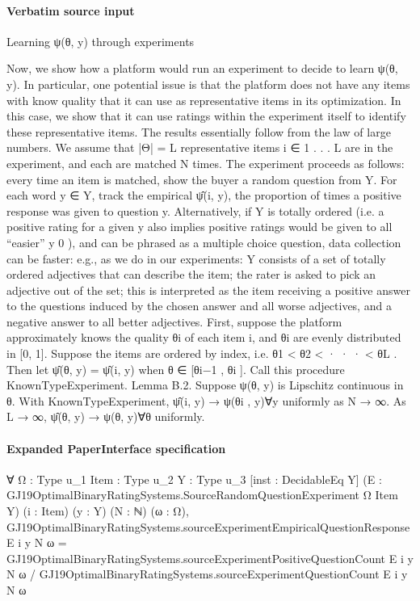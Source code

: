 \documentclass[10pt]{article}
\begin{document}
\paragraph{Verbatim source input}
\begin{ReviewVerbatim}
Learning ψ(θ, y) through experiments

Now, we show how a platform would run an experiment to decide to learn ψ(θ, y). In particular,
one potential issue is that the platform does not have any items with know quality that it can use
as representative items in its optimization. In this case, we show that it can use ratings within the
experiment itself to identify these representative items. The results essentially follow from the law
of large numbers.
We assume that |Θ| = L representative items i ∈ {1 . . . L} are in the experiment, and each are
matched N times. The experiment proceeds as follows: every time an item is matched, show the
buyer a random question from Y. For each word y ∈ Y, track the empirical ψ̂(i, y), the proportion
of times a positive response was given to question y. Alternatively, if Y is totally ordered (i.e. a
positive rating for a given y also implies positive ratings would be given to all “easier” y 0 ), and
can be phrased as a multiple choice question, data collection can be faster: e.g., as we do in our
experiments: Y consists of a set of totally ordered adjectives that can describe the item; the rater is
asked to pick an adjective out of the set; this is interpreted as the item receiving a positive answer
to the questions induced by the chosen answer and all worse adjectives, and a negative answer to
all better adjectives.
First, suppose the platform approximately knows the quality θi of each item i, and θi are evenly
distributed in [0, 1]. Suppose the items are ordered by index, i.e. θ1 < θ2 < · · · < θL . Then let
ψ̂(θ, y) = ψ̂(i, y) when θ ∈ [θi−1 , θi ]. Call this procedure KnownTypeExperiment.
Lemma B.2. Suppose ψ(θ, y) is Lipschitz continuous in θ. With KnownTypeExperiment, ψ̂(i, y) →
ψ(θi , y)∀y uniformly as N → ∞. As L → ∞, ψ̂(θ, y) → ψ(θ, y)∀θ uniformly.
\end{ReviewVerbatim}


\paragraph{Expanded PaperInterface specification}
\begin{ReviewVerbatim}
∀ {Ω : Type u_1} {Item : Type u_2} {Y : Type u_3} [inst : DecidableEq Y]
  (E : GJ19OptimalBinaryRatingSystems.SourceRandomQuestionExperiment Ω Item Y) (i : Item) (y : Y) (N : ℕ) (ω : Ω),
  GJ19OptimalBinaryRatingSystems.sourceExperimentEmpiricalQuestionResponse E i y N ω =
    GJ19OptimalBinaryRatingSystems.sourceExperimentPositiveQuestionCount E i y N ω /
      GJ19OptimalBinaryRatingSystems.sourceExperimentQuestionCount E i y N ω
\end{ReviewVerbatim}
\end{document}
